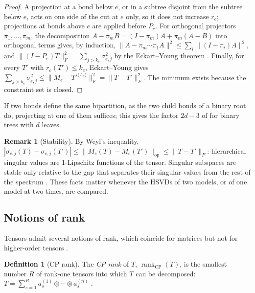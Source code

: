 \documentclass[11pt]{article}
\newcommand{\rankcp}{\operatorname{rank}_{\mathrm{CP}}}
\newcommand{\norm}[1]{\lVert #1\rVert}
\theoremstyle{definition}
\newtheorem{definition}[theorem]{Definition}
\newtheorem{remark}[theorem]{Remark}
\numberwithin{equation}{section}
\begin{document}
\begin{proof}
A projection at a bond below $e$, or in a subtree disjoint from the subtree below $e$, acts on one side of the cut at $e$ only, so it does not increase $r_e$; projections at bonds above $e$ are applied before $P_e$. For orthogonal projectors $\pi_1,\dots,\pi_m$, the decomposition $A-\pi_mB=(I-\pi_m)A+\pi_m(A-B)$ into orthogonal terms gives, by induction, $\norm{A-\pi_m\cdots\pi_1A}^2\le\sum_i\norm{(I-\pi_i)A}^2$, and $\norm{(I-P_e)T}_F^2=\sum_{j>k_e}\sigma_{e,j}^2$ by the Eckart--Young theorem \citep{eckart1936approximation}. Finally, for every $T'$ with $r_e(T')\le k_e$, Eckart--Young gives $\sum_{j>k_e}\sigma_{e,j}^2\le\norm{M_e-T'^{\langle A_e\rangle}}_F^2=\norm{T-T'}_F^2$. The minimum exists because the constraint set is closed.
\end{proof}

If two bonds define the same bipartition, as the two child bonds of a binary root do, projecting at one of them suffices; this gives the factor $2d-3$ of \citet{grasedyck2010hierarchical} for binary trees with $d$ leaves.

\begin{remark}[Stability]\label{rem:stability}
By Weyl's inequality, $|\sigma_{e,j}(T)-\sigma_{e,j}(T')|\le\norm{M_e(T)-M_e(T')}_{\mathrm{op}}\le\norm{T-T'}_F$: hierarchical singular values are 1-Lipschitz functions of the tensor. Singular subspaces are stable only relative to the gap that separates their singular values from the rest of the spectrum \citep{davis1970rotation,wedin1972perturbation}. These facts matter whenever the HSVDs of two models, or of one model at two times, are compared.
\end{remark}

\subsection{Notions of rank}\label{sec:ranks}

Tensors admit several notions of rank, which coincide for matrices but not for higher-order tensors \citep{kolda2009tensor,lim2021tensors}.

\begin{definition}[CP rank]
The \emph{CP rank} of $T$, $\rankcp(T)$, is the smallest number $R$ of rank-one tensors into which $T$ can be decomposed: $T=\sum_{s=1}^Ra_s^{(1)}\otimes\cdots\otimes a_s^{(n)}$ \citep{hitchcock1927expression}.
\end{definition}
\end{document}
